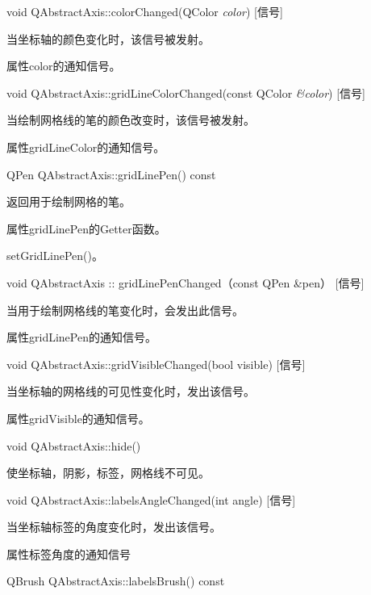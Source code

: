void QAbstractAxis::colorChanged(QColor \emph{color}) [信号] 

当坐标轴的颜色变化时，该信号被发射。 

\begin{notice}
属性color的通知信号。
\end{notice}

void QAbstractAxis::gridLineColorChanged(const QColor \emph{\&color}) [信号] 

当绘制网格线的笔的颜色改变时，该信号被发射。

\begin{notice}
属性gridLineColor的通知信号。
\end{notice}

QPen QAbstractAxis::gridLinePen() const

返回用于绘制网格的笔。 

\begin{notice}
属性gridLinePen的Getter函数。 
\end{notice}

\begin{notice}[另请参阅]
setGridLinePen()。
\end{notice}

void QAbstractAxis :: gridLinePenChanged（const QPen \&pen） [信号] 

当用于绘制网格线的笔变化时，会发出此信号。 



\begin{notice}
属性gridLinePen的通知信号。
\end{notice}

void QAbstractAxis::gridVisibleChanged(bool visible) [信号] 

当坐标轴的网格线的可见性变化时，发出该信号。 

\begin{notice}
属性gridVisible的通知信号。
\end{notice}

void QAbstractAxis::hide() 

使坐标轴，阴影，标签，网格线不可见。

void QAbstractAxis::labelsAngleChanged(int angle) [信号]

当坐标轴标签的角度变化时，发出该信号。 

\begin{notice}
属性标签角度的通知信号
\end{notice}

QBrush QAbstractAxis::labelsBrush() const 

